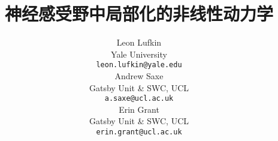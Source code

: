 \documentclass{article}
\title{
  神经感受野中局部化的非线性动力学
}
\author{
	Leon Lufkin \\
	Yale University \\
	\texttt{leon.lufkin@yale.edu} \\
    	\And
	Andrew Saxe \\
	Gatsby Unit \& SWC, UCL \\
	\texttt{a.saxe@ucl.ac.uk} \\
	\And
	Erin Grant \\
	Gatsby Unit \& SWC, UCL \\
	\texttt{erin.grant@ucl.ac.uk}
}
\begin{document}
\maketitle

\begin{abstract}
  
\end{abstract}








\clearpage


\printbibliography

\clearpage
\appendix


\end{document}
